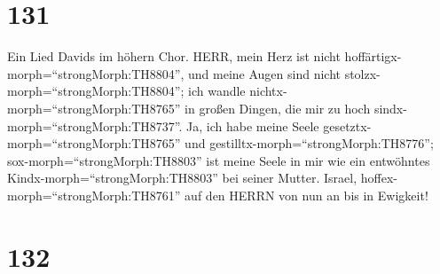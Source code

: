 \hypertarget{section-130}{%
\section{131}\label{section-130}}

 Ein Lied Davids im höhern Chor. HERR, mein Herz ist nicht
hoffärtigx-morph=``strongMorph:TH8804'', und meine Augen sind nicht
stolzx-morph=``strongMorph:TH8804''; ich wandle
nichtx-morph=``strongMorph:TH8765'' in großen Dingen, die mir zu hoch
sindx-morph=``strongMorph:TH8737''.  Ja, ich habe meine
Seele gesetztx-morph=``strongMorph:TH8765'' und
gestilltx-morph=``strongMorph:TH8776''; sox-morph=``strongMorph:TH8803''
ist meine Seele in mir wie ein entwöhntes
Kindx-morph=``strongMorph:TH8803'' bei seiner Mutter. 
Israel, hoffex-morph=``strongMorph:TH8761'' auf den HERRN von nun an bis
in Ewigkeit!

\hypertarget{section-131}{%
\section{132}\label{section-131}}

